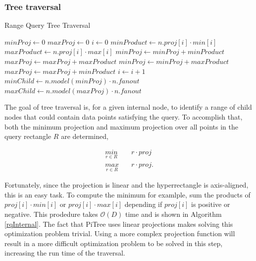 \documentclass[sigconf,10pt]{acmart}
\begin{document}
\subsubsection{Tree traversal}

\begin{algorithm}
  \caption{Range Query Tree Traversal}
  \label{rqInternal}
    \begin{algorithmic}[1]
    \State {}
    \State \Return{}
    \EndIf
    \State $minProj\gets 0$
    \State $maxProj\gets 0$
    \State $i\gets 0$
    \State $minProduct\gets n.proj[i] \cdot min[i]$
    \State $maxProduct\gets n.proj[i] \cdot max[i]$
    \State $minProj\gets minProj + minProduct$
    \State $maxProj\gets maxProj + maxProduct$
    \Else
    \State $minProj\gets minProj + maxProduct$
    \State $maxProj\gets maxProj + minProduct$
    \EndIf
    \State $i\gets i+1$
    \EndWhile
    \State $minChild \gets n.model(minProj) \cdot n.fanout$
    \State $maxChild \gets n.model(maxProj) \cdot n.fanout$
    \State {}
    \EndFor
    \EndProcedure
  \end{algorithmic}
\end{algorithm}

The goal of tree traversal is, for a given internal node, to identify a range of child nodes
that could contain data points satisfying the query. To accomplish that,
both the minimum projection and maximum projection
over all points in the query rectangle $R$ are determined,

\begin{align*} 
  \underset{r \in R}{min} \quad & r \cdot proj \\
  \underset{r \in R}{max} \quad & r \cdot proj.
\end{align*}

Fortunately, since the projection is linear and the hyperrectangle
is axis-aligned, this is an easy task. To compute the minimum for examlple,
sum the products of $proj[i] \cdot min[i]$ or $proj[i] \cdot max[i]$ depending
if $proj[i]$ is positive or negative. This prodedure takes $\mathcal{O}(D)$ time
and is shown in Algorithm \ref{rqInternal}. The fact that PiTree uses linear projections
makes solving this optimization problem trivial. Using a more
complex projection function will result in a more
difficult optimization problem to be solved in this step, increasing
the run time of the traversal.
\end{document}
